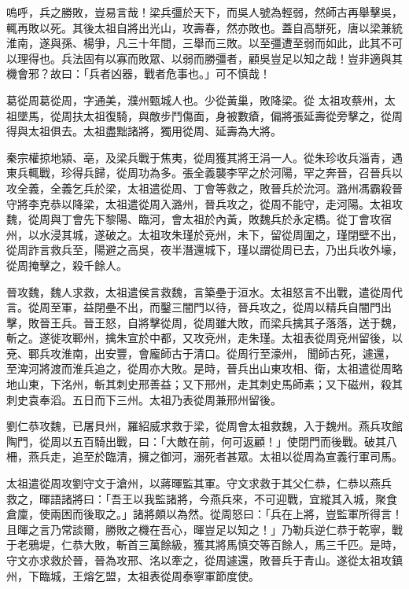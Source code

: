 \begin{pinyinscope}
 嗚呼，兵之勝敗，豈易言哉！梁兵彊於天下，而吳人號為輕弱，然師古再舉擊吳，輒再敗以死。其後太祖自將出光山，攻壽春，然亦敗也。蓋自高駢死，唐以梁兼統淮南，遂與孫、楊爭，凡三十年間，三舉而三敗。以至彊遭至弱而如此，此其不可以理得也。兵法固有以寡而敗眾、以弱而勝彊者，顧吳豈足以知之哉！豈非適與其機會邪？故曰：「兵者凶器，戰者危事也。」可不慎哉！



 葛從周葛從周，字通美，濮州甄城人也。少從黃巢，敗降梁。從
 太祖攻蔡州，太祖墜馬，從周扶太祖復騎，與敵步鬥傷面，身被數瘡，偏將張延壽從旁擊之，從周得與太祖俱去。太祖盡黜諸將，獨用從周、延壽為大將。



 秦宗權掠地潁、亳，及梁兵戰于焦夷，從周獲其將王涓一人。從朱珍收兵淄青，遇東兵輒戰，珍得兵歸，從周功為多。張全義襲李罕之於河陽，罕之奔晉，召晉兵以攻全義，全義乞兵於梁，太祖遣從周、丁會等救之，敗晉兵於沇河。潞州馮霸殺晉守將李克恭以降梁，太祖遣從周入潞州，晉兵攻之，從周不能守，走河陽。太祖攻魏，從周與丁會先下黎陽、臨河，會太祖於內黃，敗魏兵於永定橋。從丁會攻宿
 州，以水浸其城，遂破之。太祖攻朱瑾於兗州，未下，留從周圍之，瑾閉壁不出，從周詐言救兵至，陽避之高吳，夜半潛還城下，瑾以謂從周已去，乃出兵收外壕，從周掩擊之，殺千餘人。



 晉攻魏，魏人求救，太祖遣侯言救魏，言築壘于洹水。太祖怒言不出戰，遣從周代言。從周至軍，益閉壘不出，而鑿三闇門以待，晉兵攻之，從周以精兵自闇門出擊，敗晉王兵。晉王怒，自將擊從周，從周雖大敗，而梁兵擒其子落落，送于魏，斬之。遂徙攻鄆州，擒朱宣於中都，又攻兗州，走朱瑾。太祖表從周兗州留後，以兗、鄆兵攻淮南，出安豐，會龐師古于清口。從周行至濠州，
 聞師古死，遽還，至渒河將渡而淮兵追之，從周亦大敗。是時，晉兵出山東攻相、衛，太祖遣從周略地山東，下洺州，斬其刺史邢善益；又下邢州，走其刺史馬師素；又下磁州，殺其刺史袁奉滔。五日而下三州。太祖乃表從周兼邢州留後。



 劉仁恭攻魏，已屠貝州，羅紹威求救于梁，從周會太祖救魏，入于魏州。燕兵攻館陶門，從周以五百騎出戰，曰：「大敵在前，何可返顧！」使閉門而後戰。破其八柵，燕兵走，追至於臨清，擁之御河，溺死者甚眾。太祖以從周為宣義行軍司馬。



 太祖遣從周攻劉守文于滄州，以蔣暉監其軍。守文求救于其父仁恭，仁恭以燕兵
 救之，暉語諸將曰：「吾王以我監諸將，今燕兵來，不可迎戰，宜縱其入城，聚食倉廩，使兩困而後取之。」諸將頗以為然。從周怒曰：「兵在上將，豈監軍所得言！且暉之言乃常談爾，勝敗之機在吾心，暉豈足以知之！」乃勒兵逆仁恭于乾寧，戰于老鴉堤，仁恭大敗，斬首三萬餘級，獲其將馬慎交等百餘人，馬三千匹。是時，守文亦求救於晉，晉為攻邢、洺以牽之，從周遽還，敗晉兵于青山。遂從太祖攻鎮州，下臨城，王熔乞盟，太祖表從周泰寧軍節度使。




\end{pinyinscope}
